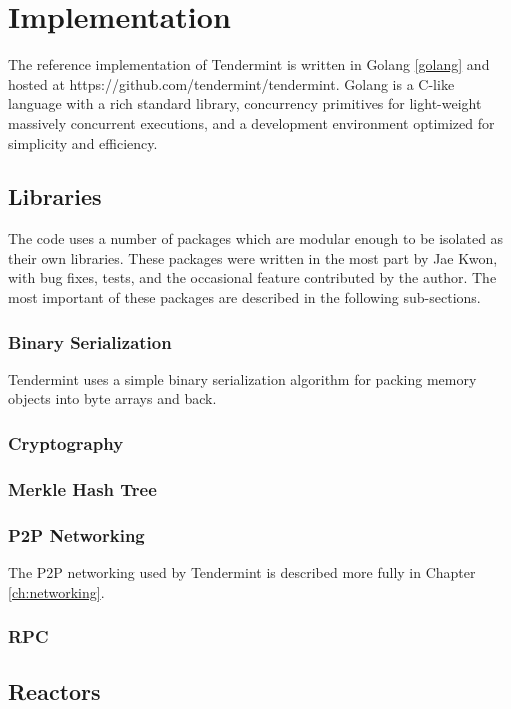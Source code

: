 \chapter{Implementation}
\label{ch:implementation}

The reference implementation of Tendermint is written in Golang \ref{golang} and hosted at https://github.com/tendermint/tendermint.
Golang is a C-like language with a rich standard library, concurrency primitives for light-weight massively concurrent executions,
and a development environment optimized for simplicity and efficiency.

\section{Libraries}

The code uses a number of packages which are modular enough to be isolated as their own libraries.
These packages were written in the most part by Jae Kwon, with bug fixes, tests, and the occasional feature contributed by the author.
The most important of these packages are described in the following sub-sections.

\subsection{Binary Serialization}

Tendermint uses a simple binary serialization algorithm for packing memory objects into byte arrays and back.


\subsection{Cryptography}
\subsection{Merkle Hash Tree}
\subsection{P2P Networking}

The P2P networking used by Tendermint is described more fully in Chapter \ref{ch:networking}.

\subsection{RPC}

\section{Reactors}

